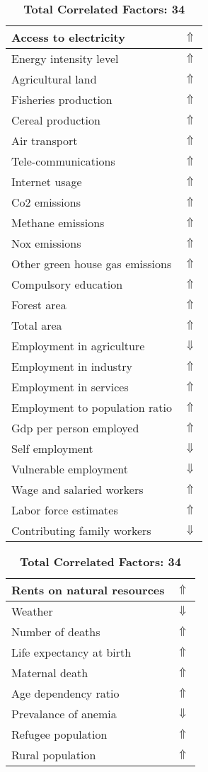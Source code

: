 \documentclass[12pt,notitlepage,oneside]{report}
\begin{document}
\begin{table}[!htb]
\caption{\textbf{Affects: Interaugmentory System $\Uparrow$}}
\centering
\label{Correlated Socio-economic Factors0}
\begin{tabular}{|l|l|}
\hline
Access to electricity & $\Uparrow$\\ \hline
Energy intensity level & $\Uparrow$\\ \hline
Agricultural land & $\Uparrow$\\ \hline
Fisheries production & $\Uparrow$\\ \hline
Cereal production & $\Uparrow$\\ \hline
Air transport  & $\Uparrow$\\ \hline
Tele-communications & $\Uparrow$\\ \hline
Internet usage & $\Uparrow$\\ \hline
Co2 emissions & $\Uparrow$\\ \hline
Methane emissions & $\Uparrow$\\ \hline
Nox emissions & $\Uparrow$\\ \hline
Other green house gas emissions & $\Uparrow$\\ \hline
Compulsory education & $\Uparrow$\\ \hline
Forest area & $\Uparrow$\\ \hline
Total area & $\Uparrow$\\ \hline
Employment in agriculture & $\Downarrow$\\ \hline
Employment in industry & $\Uparrow$\\ \hline
Employment in services & $\Uparrow$\\ \hline
Employment to population ratio & $\Uparrow$\\ \hline
Gdp per person employed & $\Uparrow$\\ \hline
Self employment & $\Downarrow$\\ \hline
Vulnerable employment & $\Downarrow$\\ \hline
Wage and salaried workers & $\Uparrow$\\ \hline
Labor force estimates & $\Uparrow$\\ \hline
Contributing family workers & $\Downarrow$\\ \hline
\end{tabular}
\begin{tabular}{|l|l|}
\hline
Rents on natural resources & $\Uparrow$\\ \hline
Weather & $\Downarrow$\\ \hline
Number of deaths & $\Uparrow$\\ \hline
Life expectancy at birth & $\Uparrow$\\ \hline
Maternal death & $\Uparrow$\\ \hline
Age dependency ratio & $\Uparrow$\\ \hline
Prevalance of anemia & $\Downarrow$\\ \hline
Refugee population & $\Uparrow$\\ \hline
Rural population & $\Uparrow$\\ \hline
\end{tabular}
\caption*{\textbf{Total Correlated Factors: 34}}
\end{table}
\end{document}
